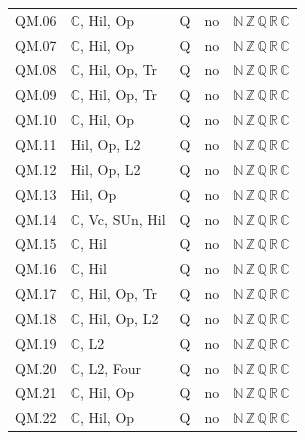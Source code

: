 {\begin{longtable}{l p{6.8cm} c c l}
QM.06 & $\mathbb C$, \textsf{Hil}, \textsf{Op} & Q & no & $\mathbb N\,\mathbb Z\,\mathbb Q\,\mathbb R\,\mathbb C$ \\
QM.07 & $\mathbb C$, \textsf{Hil}, \textsf{Op} & Q & no & $\mathbb N\,\mathbb Z\,\mathbb Q\,\mathbb R\,\mathbb C$ \\
QM.08 & $\mathbb C$, \textsf{Hil}, \textsf{Op}, \textsf{Tr} & Q & no & $\mathbb N\,\mathbb Z\,\mathbb Q\,\mathbb R\,\mathbb C$ \\
QM.09 & $\mathbb C$, \textsf{Hil}, \textsf{Op}, \textsf{Tr} & Q & no & $\mathbb N\,\mathbb Z\,\mathbb Q\,\mathbb R\,\mathbb C$ \\
QM.10 & $\mathbb C$, \textsf{Hil}, \textsf{Op} & Q & no & $\mathbb N\,\mathbb Z\,\mathbb Q\,\mathbb R\,\mathbb C$ \\
QM.11 & \textsf{Hil}, \textsf{Op}, \textsf{L2} & Q & no & $\mathbb N\,\mathbb Z\,\mathbb Q\,\mathbb R\,\mathbb C$ \\
QM.12 & \textsf{Hil}, \textsf{Op}, \textsf{L2} & Q & no & $\mathbb N\,\mathbb Z\,\mathbb Q\,\mathbb R\,\mathbb C$ \\
QM.13 & \textsf{Hil}, \textsf{Op} & Q & no & $\mathbb N\,\mathbb Z\,\mathbb Q\,\mathbb R\,\mathbb C$ \\
QM.14 & $\mathbb C$, \textsf{Vc}, \textsf{SUn}, \textsf{Hil} & Q & no & $\mathbb N\,\mathbb Z\,\mathbb Q\,\mathbb R\,\mathbb C$ \\
QM.15 & $\mathbb C$, \textsf{Hil} & Q & no & $\mathbb N\,\mathbb Z\,\mathbb Q\,\mathbb R\,\mathbb C$ \\
QM.16 & $\mathbb C$, \textsf{Hil} & Q & no & $\mathbb N\,\mathbb Z\,\mathbb Q\,\mathbb R\,\mathbb C$ \\
QM.17 & $\mathbb C$, \textsf{Hil}, \textsf{Op}, \textsf{Tr} & Q & no & $\mathbb N\,\mathbb Z\,\mathbb Q\,\mathbb R\,\mathbb C$ \\
QM.18 & $\mathbb C$, \textsf{Hil}, \textsf{Op}, \textsf{L2} & Q & no & $\mathbb N\,\mathbb Z\,\mathbb Q\,\mathbb R\,\mathbb C$ \\
QM.19 & $\mathbb C$, \textsf{L2} & Q & no & $\mathbb N\,\mathbb Z\,\mathbb Q\,\mathbb R\,\mathbb C$ \\
QM.20 & $\mathbb C$, \textsf{L2}, \textsf{Four} & Q & no & $\mathbb N\,\mathbb Z\,\mathbb Q\,\mathbb R\,\mathbb C$ \\
QM.21 & $\mathbb C$, \textsf{Hil}, \textsf{Op} & Q & no & $\mathbb N\,\mathbb Z\,\mathbb Q\,\mathbb R\,\mathbb C$ \\
QM.22 & $\mathbb C$, \textsf{Hil}, \textsf{Op} & Q & no & $\mathbb N\,\mathbb Z\,\mathbb Q\,\mathbb R\,\mathbb C$ \\

\end{longtable}}
